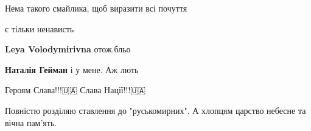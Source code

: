 \begin{itemize}
Нема такого смайлика, щоб виразити всі почуття

\begin{itemize}

 
є тільки ненависть


 
\textbf{Leya Volodymirivna} отож.бльо

 
\textbf{Наталія Гейман} і у мене. Аж лють
\end{itemize}

 
Героям Слава!!!🇺🇦
Слава Нації!!!🇺🇦

 
Повністю розділяю ставлення до "руськомирних". А хлопцям царство небесне та вічна пам'ять.

 
🖤🇺🇦


\begin{itemize}
 

\end{itemize}
\end{itemize}
